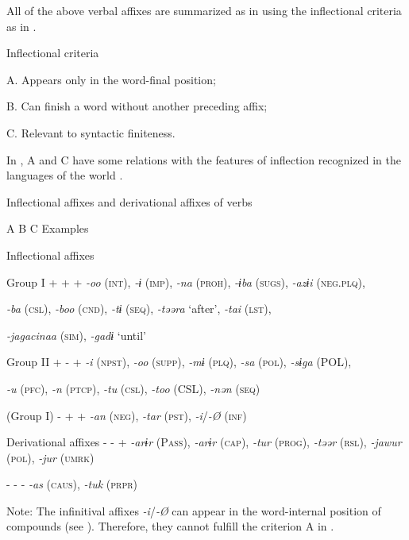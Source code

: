   All of the above verbal affixes are summarized as in  using the inflectional criteria as in .

\ea\label{ex:8-9}
  Inflectional criteria

  A.  Appears only in the word-final position;

  B.  Can finish a word without another preceding affix;

  C.  Relevant to syntactic finiteness.

In , A and C have some relations with the features of inflection recognized in the languages of the world \citep[90]{Haspelmath2010}.

\begin{table}
\caption{\label{tab:key:55}Inflectional affixes and derivational affixes of verbs}

  A  B  C  Examples

Inflectional affixes

  Group I  +  +  +  \textit{{}-oo} (\textsc{int}), \textit{{}-ɨ} (\textsc{imp}), \textit{{}-na} (\textsc{proh}), \textit{{}-ɨba} (\textsc{sugs}), \textit{{}-azɨi} (\textsc{neg}.\textsc{plq}),

\textit{{}-ba} (\textsc{csl}), \textit{{}-boo} (\textsc{cnd}), \textit{{}-tɨ} (\textsc{seq}), \textit{{}-təəra} ‘after’, \textit{{}-tai} (\textsc{lst}),

\textit{{}-jagacinaa} (\textsc{sim}), \textit{{}-gadɨ} ‘until’

  Group II  +  {}-  +  \textit{{}-i} (\textsc{npst}), \textit{{}-oo} (\textsc{supp}), \textit{{}-mɨ} (\textsc{plq}), \textit{{}-sa} (\textsc{pol}), \textit{{}-sɨga} (POL),

\textit{{}-u} (\textsc{pfc}), \textit{{}-n} (\textsc{ptcp}), \textit{{}-tu} (\textsc{csl}), \textit{{}-too} (CSL), \textit{{}-nən} (\textsc{seq})

  (Group I)  {}-  +  +  \textit{{}-an} (\textsc{neg}), \textit{-tar} (\textsc{pst}), \textit{{}-i}/\textit{{}-Ø} (\textsc{inf})

Derivational affixes  {}-  {}-  +  \textit{{}-arɨr} (P\textsc{ass}), \textit{-arɨr} (\textsc{cap}), \textit{-tur} (\textsc{prog}), \textit{{}-təər} (\textsc{rsl}), \textit{{}-jawur} (\textsc{pol}), \textit{{}-jur} (\textsc{umrk})

  {}-  {}-  {}-  \textit{{}-as} (\textsc{caus}), \textit{{}-tuk} (\textsc{prpr})

Note: The infinitival affixes \textit{{}-i}/\textit{{}-Ø} can appear in the word-internal position of compounds (see ). Therefore, they cannot fulfill the criterion A in .
\end{table}

